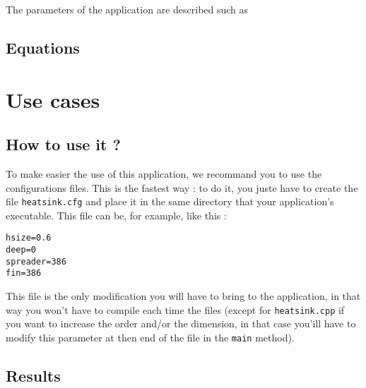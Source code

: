 The parameters of the application are described such as 
%

\subsection{Equations}
\label{heat:eq_impl}

\section{Use cases}
\subsection{How to use it ?}
To make easier the use of this application, we recommand you to use the configurations files. This is the fastest way : to do it, you juste have to create the file \lstinline!heatsink.cfg! and place it in the same directory that your application's executable. This file can be, for example, like this :
\begin{lstlisting}
hsize=0.6
deep=0
spreader=386
fin=386
\end{lstlisting}
This file is the only modification you will have to bring to the application, in that way you won't have to compile each time the files (except for \lstinline!heatsink.cpp! if you want to increase the order and/or the dimension, in that case you'ill have to modify this parameter at then end of the file in the \lstinline!main! method).

\subsection{Results}
